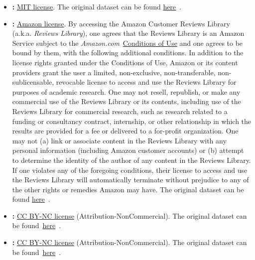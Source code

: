 \begin{itemize}[leftmargin=*]
    \item \textbf{\href{https://object-arbutus.cloud.computecanada.ca/tgb/tgbl-wiki-v2.zip}{\wikipedia}:} \underline{MIT license}. The original dataset can be found \href{http://snap.stanford.edu/jodie/#datasets}{here}~\cite{kumar2019predicting}.
    
    \item \textbf{\href{https://object-arbutus.cloud.computecanada.ca/tgb/tgbl-review-v2.zip}{\review}:} \underline{Amazon license}. By accessing the Amazon Customer Reviews Library (a.k.a. \textit{Reviews Library}), one agrees that the Reviews Library is an Amazon Service subject to the \textit{Amazon.com}~\href{https://www.amazon.com/gp/help/customer/display.html/ref=footer_cou?ie=UTF8&nodeId=508088}{Conditions of Use} and one agrees to be bound by them, with the following additional conditions. In addition to the license rights granted under the Conditions of Use, Amazon or its content providers grant the user a limited, non-exclusive, non-transferable, non-sublicensable, revocable license to access and use the Reviews Library for purposes of academic research. One may not resell, republish, or make any commercial use of the Reviews Library or its contents, including use of the Reviews Library for commercial research, such as research related to a funding or consultancy contract, internship, or other relationship in which the results are provided for a fee or delivered to a for-profit organization. One may not (a) link or associate content in the Reviews Library with any personal information (including Amazon customer accounts) or (b) attempt to determine the identity of the author of any content in the Reviews Library. If one violates any of the foregoing conditions, their license to access and use the Reviews Library will automatically terminate without prejudice to any of the other rights or remedies Amazon may have. The original dataset can be found \href{https://nijianmo.github.io/amazon/index.html}{here}~\cite{ni2019justifying}.  
    
    \item \textbf{\href{https://object-arbutus.cloud.computecanada.ca/tgb/tgbl-coin.zip}{\coin}:} \underline{CC BY-NC license} (Attribution-NonCommercial). The original dataset can be found~\href{https://www.chartalist.org/eth/StablecoinAnalysis.html}{here}~\cite{chartalistNeurips2022}.
    
    \item \textbf{\href{https://object-arbutus.cloud.computecanada.ca/tgb/tgbl-comment.zip}{\reddit}:} \underline{CC BY-NC license} (Attribution-NonCommercial).  The original dataset can be found~\href{https://surfdrive.surf.nl/files/index.php/s/M09RDerAMZrQy8q}{here}~\cite{nadiri2022large}.
    

\end{itemize}
